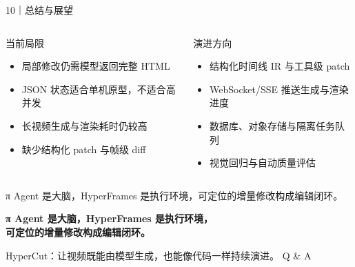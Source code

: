 \documentclass[aspectratio=169,UTF8,11pt]{ctexbeamer}
\begin{document}
\begin{frame}{10｜总结与展望}
  \begin{columns}[T,onlytextwidth]
      \begin{block}{当前局限}
        \begin{itemize}
          \item 局部修改仍需模型返回完整 HTML
          \item JSON 状态适合单机原型，不适合高并发
          \item 长视频生成与渲染耗时仍较高
          \item 缺少结构化 patch 与帧级 diff
        \end{itemize}
      \end{block}
      \begin{block}{演进方向}
        \begin{itemize}
          \item 结构化时间线 IR 与工具级 patch
          \item WebSocket/SSE 推送生成与渲染进度
          \item 数据库、对象存储与隔离任务队列
          \item 视觉回归与自动质量评估
        \end{itemize}
      \end{block}
  \end{columns}
  \vspace{0.5cm}
  \centering\alert{π Agent 是大脑，HyperFrames 是执行环境，可定位的增量修改构成编辑闭环。}
\end{frame}

{
\begin{frame}[plain]
  \centering
  \vfill
  {\color{hclime}\LARGE\bfseries π Agent 是大脑，HyperFrames 是执行环境，\\[2mm]可定位的增量修改构成编辑闭环。}
  \vspace{0.8cm}

  {\color{white}\large HyperCut：让视频既能由模型生成，也能像代码一样持续演进。}
  \vfill
  {\color{gray}\small Q \& A}
\end{frame}}
\end{document}
